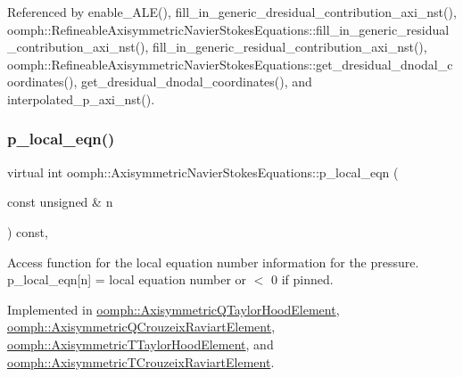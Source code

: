 Referenced by enable\+\_\+\+A\+L\+E(), fill\+\_\+in\+\_\+generic\+\_\+dresidual\+\_\+contribution\+\_\+axi\+\_\+nst(), oomph\+::\+Refineable\+Axisymmetric\+Navier\+Stokes\+Equations\+::fill\+\_\+in\+\_\+generic\+\_\+residual\+\_\+contribution\+\_\+axi\+\_\+nst(), fill\+\_\+in\+\_\+generic\+\_\+residual\+\_\+contribution\+\_\+axi\+\_\+nst(), oomph\+::\+Refineable\+Axisymmetric\+Navier\+Stokes\+Equations\+::get\+\_\+dresidual\+\_\+dnodal\+\_\+coordinates(), get\+\_\+dresidual\+\_\+dnodal\+\_\+coordinates(), and interpolated\+\_\+p\+\_\+axi\+\_\+nst().

\mbox{\label{classoomph_1_1AxisymmetricNavierStokesEquations_ad6ac62ca5fa411c365fd2ecc72aa25e8}} 
\subsubsection{\texorpdfstring{p\+\_\+local\+\_\+eqn()}{p\_local\_eqn()}}
{\footnotesize\ttfamily virtual int oomph\+::\+Axisymmetric\+Navier\+Stokes\+Equations\+::p\+\_\+local\+\_\+eqn (\begin{DoxyParamCaption}\item[{const unsigned \&}]{n }\end{DoxyParamCaption}) const\hspace{0.3cm}{\ttfamily [protected]}, {}}



Access function for the local equation number information for the pressure. p\+\_\+local\+\_\+eqn\mbox{[}n\mbox{]} = local equation number or $<$ 0 if pinned. 



Implemented in \hyperlink{classoomph_1_1AxisymmetricQTaylorHoodElement_a5593ee69e94a15cca6f309bb38717913}{oomph\+::\+Axisymmetric\+Q\+Taylor\+Hood\+Element}, \hyperlink{classoomph_1_1AxisymmetricQCrouzeixRaviartElement_adc569122e3649deba56231175f3116cf}{oomph\+::\+Axisymmetric\+Q\+Crouzeix\+Raviart\+Element}, \hyperlink{classoomph_1_1AxisymmetricTTaylorHoodElement_a69d3da303d873ab134ec3e382fc919c0}{oomph\+::\+Axisymmetric\+T\+Taylor\+Hood\+Element}, and \hyperlink{classoomph_1_1AxisymmetricTCrouzeixRaviartElement_af9acbebdb665021f80bf849904f52c7c}{oomph\+::\+Axisymmetric\+T\+Crouzeix\+Raviart\+Element}.



